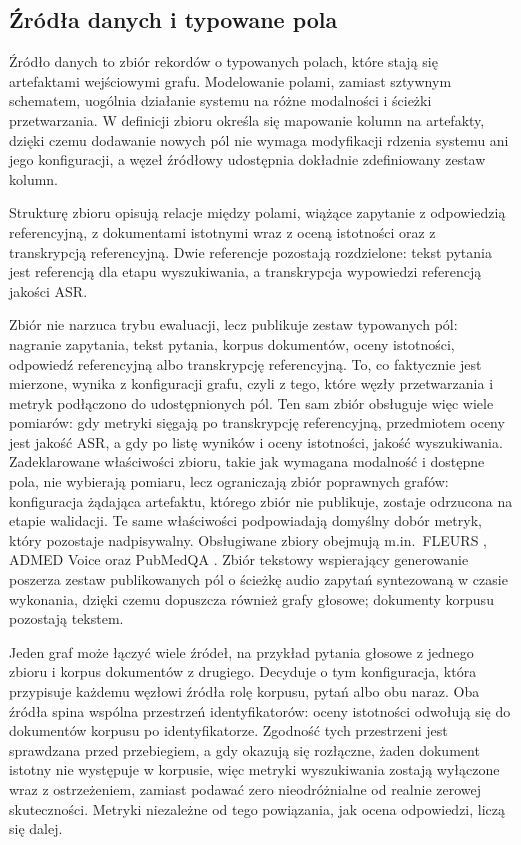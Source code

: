 \subsection{Źródła danych i typowane pola}
Źródło danych to zbiór rekordów o typowanych polach, które stają się artefaktami wejściowymi
grafu. Modelowanie polami, zamiast sztywnym schematem, uogólnia działanie systemu na różne modalności
i ścieżki przetwarzania. W definicji zbioru określa się mapowanie kolumn na artefakty,
dzięki czemu dodawanie nowych pól nie wymaga modyfikacji rdzenia systemu ani jego konfiguracji,
a węzeł źródłowy udostępnia dokładnie zdefiniowany zestaw kolumn.

Strukturę zbioru opisują relacje między polami, wiążące zapytanie z odpowiedzią referencyjną, z
dokumentami istotnymi wraz z oceną istotności oraz z transkrypcją referencyjną. Dwie referencje
pozostają rozdzielone: tekst pytania jest referencją dla etapu wyszukiwania, a transkrypcja
wypowiedzi referencją jakości ASR.

Zbiór nie narzuca trybu ewaluacji, lecz publikuje zestaw typowanych pól: nagranie zapytania,
tekst pytania, korpus dokumentów, oceny istotności, odpowiedź referencyjną albo transkrypcję
referencyjną. To, co faktycznie jest mierzone, wynika z konfiguracji grafu, czyli z tego, które
węzły przetwarzania i metryk podłączono do udostępnionych pól. Ten sam zbiór obsługuje więc wiele
pomiarów: gdy metryki sięgają po transkrypcję referencyjną, przedmiotem oceny jest jakość ASR, a
gdy po listę wyników i oceny istotności, jakość wyszukiwania. Zadeklarowane właściwości zbioru,
takie jak wymagana modalność i dostępne pola, nie wybierają pomiaru, lecz ograniczają zbiór
poprawnych grafów: konfiguracja żądająca artefaktu, którego zbiór nie publikuje, zostaje odrzucona
na etapie walidacji. Te same właściwości podpowiadają domyślny dobór metryk, który pozostaje
nadpisywalny. Obsługiwane zbiory obejmują m.in.\ FLEURS \cite{fleurs}, ADMED Voice
\cite{ADMEDVoice} oraz PubMedQA \cite{pubmed}. Zbiór tekstowy wspierający generowanie poszerza
zestaw publikowanych pól o ścieżkę audio zapytań syntezowaną w czasie wykonania, dzięki czemu
dopuszcza również grafy głosowe; dokumenty korpusu pozostają tekstem.

Jeden graf może łączyć wiele źródeł, na przykład pytania głosowe z jednego zbioru i korpus
dokumentów z drugiego. Decyduje o tym konfiguracja, która przypisuje każdemu węzłowi źródła rolę
korpusu, pytań albo obu naraz. Oba źródła spina wspólna przestrzeń identyfikatorów: oceny
istotności odwołują się do dokumentów korpusu po identyfikatorze. Zgodność tych przestrzeni jest
sprawdzana przed przebiegiem, a gdy okazują się rozłączne, żaden dokument istotny nie występuje w
korpusie, więc metryki wyszukiwania zostają wyłączone wraz z ostrzeżeniem, zamiast podawać zero
nieodróżnialne od realnie zerowej skuteczności. Metryki niezależne od tego powiązania, jak ocena
odpowiedzi, liczą się dalej.

